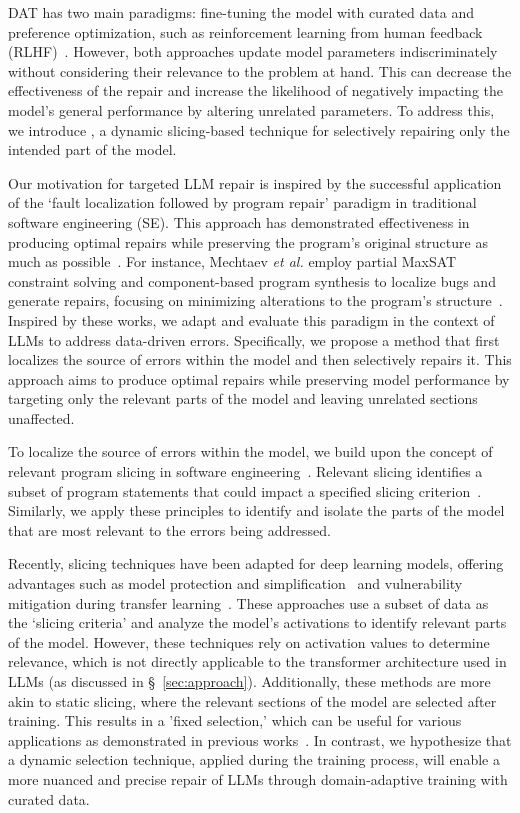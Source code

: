 DAT has two main paradigms: fine-tuning the model with curated data and preference optimization, such as reinforcement learning from human feedback (RLHF)~\cite{ouyang2022training}. However, both approaches update model parameters indiscriminately without considering their relevance to the problem at hand. This can decrease the effectiveness of the repair and increase the likelihood of negatively impacting the model's general performance by altering unrelated parameters. To address this, we introduce \nick, a dynamic slicing-based technique for selectively repairing only the intended part of the model. 


Our motivation for targeted LLM repair is inspired by the successful application of the `fault localization followed by program repair' paradigm in traditional software engineering (SE). This approach has demonstrated effectiveness in producing optimal repairs while preserving the program's original structure as much as possible~\cite{mechtaev2015directfix,nguyen2013semfix,wen2018context}. For instance, Mechtaev \textit{et al.} employ partial MaxSAT constraint solving and component-based program synthesis to localize bugs and generate repairs, focusing on minimizing alterations to the program's structure~\cite{mechtaev2015directfix}. Inspired by these works, we adapt and evaluate this paradigm in the context of LLMs to address data-driven errors. Specifically, we propose a method that first localizes the source of errors within the model and then selectively repairs it. This approach aims to produce optimal repairs while preserving model performance by targeting only the relevant parts of the model and leaving unrelated sections unaffected.


To localize the source of errors within the model, we build upon the concept of relevant program slicing in software engineering~\cite{weiser1984program}. Relevant slicing identifies a subset of program statements that could impact a specified slicing criterion~\cite{gyimothy1999efficient, zhang2022remos}. Similarly, we apply these principles to identify and isolate the parts of the model that are most relevant to the errors being addressed.

Recently, slicing techniques have been adapted for deep learning models, offering advantages such as model protection and simplification~\cite{zhang2020dynamic} and vulnerability mitigation during transfer learning~\cite{zhang2022remos}. These approaches use a subset of data as the `slicing criteria' and analyze the model's activations to identify relevant parts of the model. However, these techniques rely on activation values to determine relevance, which is not directly applicable to the transformer architecture used in LLMs (as discussed in \S~\ref{sec:approach}). Additionally, these methods are more akin to static slicing, where the relevant sections of the model are selected after training. This results in a 'fixed selection,' which can be useful for various applications as demonstrated in previous works~\cite{zhang2020dynamic, zhang2022remos}. In contrast, we hypothesize that a dynamic selection technique, applied during the training process, will enable a more nuanced and precise repair of LLMs through domain-adaptive training with curated data.


